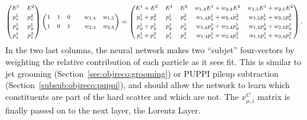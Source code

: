 \begin{equation*}
  \footnotesize
  \begin{centering}
  \begin{pmatrix}
    E^1 & E^2\\[1ex]
    p_x^1 & p_x^2\\[1ex]
    p_y^1 & p_y^1\\[1ex]
    p_z^1 & p_z^2
  \end{pmatrix}
  \begin{pmatrix}
    1 & 1 & 0 & & w_{1,4} & w_{1,5}\\[1ex]
    1 & 0 & 1 & & w_{2,4} & w_{2,5}\\
  \end{pmatrix}
  = \begin{pmatrix}
    E^1  +E^2   & E^1   & E^2   & w_{1,4}E^1   + w_{2,4}E^2   & w_{1,5}E^1  +w_{2,5}E^2    \\[1ex]
    p_x^1+p_x^2 & p_x^1 & p_x^2 & w_{1,4}p_x^1 + w_{2,4}p_x^2 & w_{1,5}p_x^1+w_{2,5}p_x^2  \\[1ex]
    p_y^1+p_y^1 & p_y^1 & p_y^1 & w_{1,4}p_y^1 + w_{2,4}p_y^1 & w_{1,5}p_y^1+w_{2,5}p_y^1  \\[1ex]
    p_z^1+p_z^2 & p_z^1 & p_z^2 & w_{1,4}p_z^1 + w_{2,4}p_z^2 & w_{1,5}p_z^1+w_{2,5}p_z^2
  \end{pmatrix}
   \end{centering}.
\end{equation*}
 In the two last columns, the neural network makes two ``subjet'' four-vectors by weighting the relative contribution of each particle as it sees fit. This is similar to jet grooming (Section~\ref{sec:objreco:grooming}) or PUPPI pileup subtraction (Section~\ref{subsub:objreco:puppi}), and should allow the network to learn which constituents are part of the hard scatter and which are not. The $x_{\mu,i}^{C}$ matrix is finally passed on to the next layer, the Lorentz Layer.
 \clearpage
